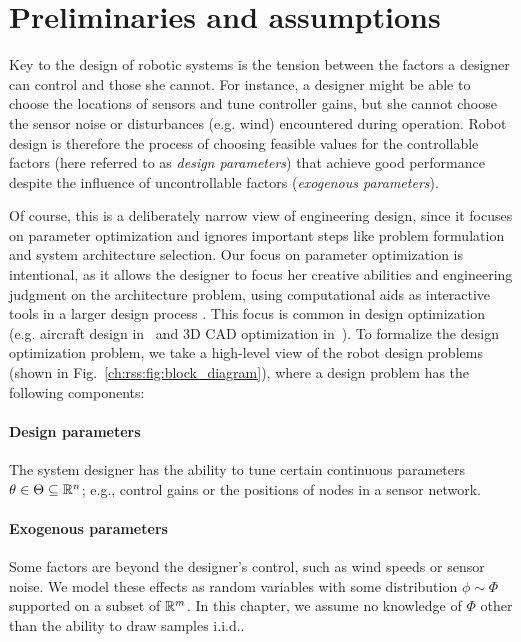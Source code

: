 \section{Preliminaries and assumptions}\label{ch:rss:prelim}

Key to the design of robotic systems is the tension between the factors a designer can control and those she cannot. For instance, a designer might be able to choose the locations of sensors and tune controller gains, but she cannot choose the sensor noise or disturbances (e.g. wind) encountered during operation.
Robot design is therefore the process of choosing feasible values for the controllable factors (here referred to as \textit{design parameters}) that achieve good performance despite the influence of uncontrollable factors (\textit{exogenous parameters}).

Of course, this is a deliberately narrow view of engineering design, since it focuses on parameter optimization and ignores important steps like problem formulation and system architecture selection. Our focus on parameter optimization is intentional, as it allows the designer to focus her creative abilities and engineering judgment on the architecture problem, using computational aids as interactive tools in a larger design process \cite{sharpe_thesis,cascaval2021differentiable}. This focus is common in design optimization (e.g. aircraft design in~\cite{sharpe_thesis} and 3D CAD optimization in~\cite{cascaval2021differentiable}).
%
To formalize the design optimization problem, we take a high-level view of the robot design problems (shown in Fig.~\ref{ch:rss:fig:block_diagram}), where a design problem has the following components:

\paragraph{Design parameters} The system designer has the ability to tune certain continuous parameters $\theta \in \Theta \subseteq \mathbb{R}^n$; e.g., control gains or the positions of nodes in a sensor network.
\paragraph{Exogenous parameters} Some factors are beyond the designer's control, such as wind speeds or sensor noise. We model these effects as random variables with some distribution $\phi \sim \Phi$ supported on a subset of $\mathbb{R}^m$. In this chapter, we assume no knowledge of $\Phi$ other than the ability to draw samples i.i.d..
